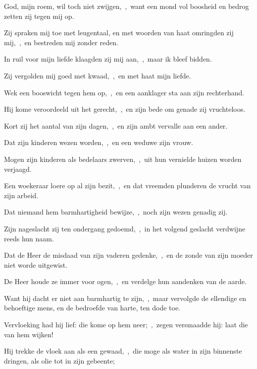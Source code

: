 \documentclass[12pt,twoside,a5paper]{article}
\begin{document}
\begin{halfparskip}

   God, mijn roem, wil toch niet zwijgen,~\sep\ want een mond vol boosheid en bedrog zetten zij tegen mij op.


  Zij spraken mij toe met leugentaal, en met woorden van haat omringden zij mij,~\sep\ en bestreden mij zonder reden.

  In ruil voor mijn liefde klaagden zij mij aan,~\sep\ maar ik bleef bidden.

  Zij vergolden mij goed met kwaad,~\sep\ en met haat mijn liefde.

  Wek een booswicht tegen hem op,~\sep\ en een aanklager sta aan zijn rechterhand.

  Hij kome veroordeeld uit het gerecht,~\sep\ en zijn bede om genade zij vruchteloos.

  Kort zij het aantal van zijn dagen,~\sep\ en zijn ambt vervalle aan een ander.

  Dat zijn kinderen wezen worden,~\sep\ en een weduwe zijn vrouw.

  Mogen zijn kinderen als bedelaars zwerven,~\sep\ uit hun vernielde huizen worden verjaagd.

  Een woekeraar loere op al zijn bezit,~\sep\ en dat vreemden plunderen de vrucht van zijn arbeid.

  Dat niemand hem barmhartigheid bewijze,~\sep\ noch zijn wezen genadig zij.

  Zijn nageslacht zij ten ondergang gedoemd,~\sep\ in het volgend geslacht verdwijne reeds hun naam.

  Dat de Heer de misdaad van zijn vaderen gedenke,~\sep\ en de zonde van zijn moeder niet worde uitgewist.

  De Heer houde ze immer voor ogen,~\sep\ en verdelge hun aandenken van de aarde.

  Want hij dacht er niet aan barmhartig te zijn,~\sep\ maar vervolgde de ellendige en behoeftige mens, en de bedroefde van harte, ten dode toe.

  Vervloeking had hij lief: die kome op hem neer;~\sep\ zegen versmaadde hij: laat die van hem wijken!

  Hij trekke de vloek aan als een gewaad,~\sep\ die moge als water in zijn binnenste dringen, als olie tot in zijn gebeente;


\end{halfparskip}
\end{document}
